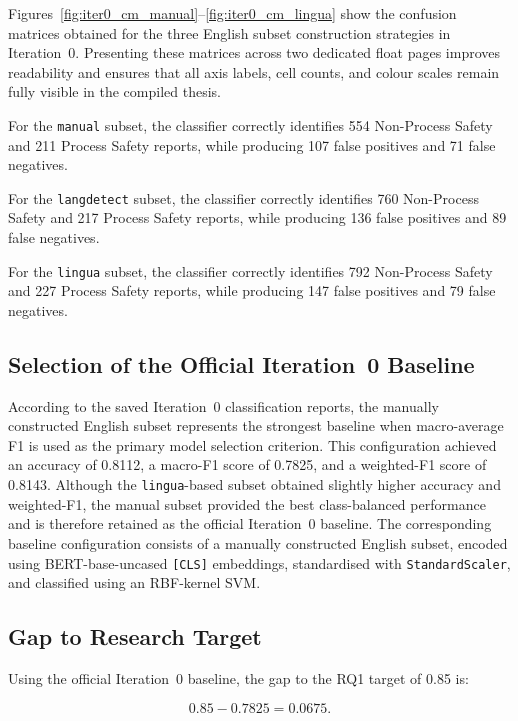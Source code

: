 \documentclass[11pt, titlepage, bibliography=totoc]{scrreprt}
\begin{document}
Figures~\ref{fig:iter0_cm_manual}--\ref{fig:iter0_cm_lingua} show the confusion matrices obtained for the three English subset construction strategies in Iteration~0. Presenting these matrices across two dedicated float pages improves readability and ensures that all axis labels, cell counts, and colour scales remain fully visible in the compiled thesis.

For the \texttt{manual} subset, the classifier correctly identifies 554 Non-Process Safety and 211 Process Safety reports, while producing 107 false positives and 71 false negatives.

For the \texttt{langdetect} subset, the classifier correctly identifies 760 Non-Process Safety and 217 Process Safety reports, while producing 136 false positives and 89 false negatives.

For the \texttt{lingua} subset, the classifier correctly identifies 792 Non-Process Safety and 227 Process Safety reports, while producing 147 false positives and 79 false negatives.

\subsection{Selection of the Official Iteration~0 Baseline}

According to the saved Iteration~0 classification reports, the manually constructed English subset represents the strongest baseline when macro-average F1 is used as the primary model selection criterion. This configuration achieved an accuracy of 0.8112, a macro-F1 score of 0.7825, and a weighted-F1 score of 0.8143. Although the \texttt{lingua}-based subset obtained slightly higher accuracy and weighted-F1, the manual subset provided the best class-balanced performance and is therefore retained as the official Iteration~0 baseline. The corresponding baseline configuration consists of a manually constructed English subset, encoded using BERT-base-uncased \texttt{[CLS]} embeddings, standardised with \texttt{StandardScaler}, and classified using an RBF-kernel SVM.

\subsection{Gap to Research Target}

Using the official Iteration~0 baseline, the gap to the RQ1 target of 0.85 is:

\begin{equation}
0.85 - 0.7825 = 0.0675.
\end{equation}
\end{document}
